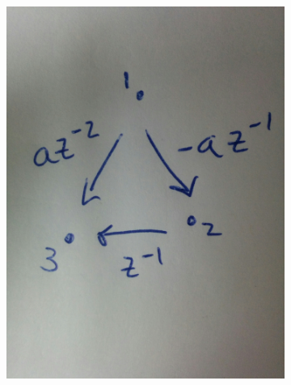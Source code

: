 \documentclass[12pt]{article}
\begin{document}
\begin{figure}
\begin{subfigure}[b]{0.45\textwidth}
    \includegraphics[width=\linewidth]{hand_drawn_example2.jpg}
  \end{subfigure}
\end{figure}
\end{document}
